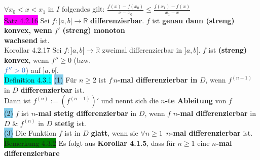 \documentclass[10pt]{article}
\begin{document}
        \indent \textcolor{NavyBlue}{$\forall x_0<x<x_1$} in \textcolor{NavyBlue}{$I$}
                folgendes gilt: \textcolor{NavyBlue}{
                $\frac{f(x)-f(x_0)}{x-x_0}\leqslant\frac{f(x_1)-f(x)}{x_1-x}$} \\
\colorbox{magenta}{Satz 4.2.16} Sei \textcolor{NavyBlue}{$f:]a,b[\longrightarrow\mathbb{R}$}
                \textbf{differenzierbar}. 
                \textcolor{NavyBlue}{$f$} ist \textbf{genau dann (streng) konvex, wenn} 
                \textcolor{NavyBlue}{$f'$} \textbf{(streng) monoton\\
        \indent wachsend} ist.\\
\colorbox{BurntOrange}{Korollar 4.2.17} Sei 
                \textcolor{NavyBlue}{$f:]a,b[\longrightarrow\mathbb{R}$}
                zweimal differenzierbar in \textcolor{NavyBlue}{$]a,b[$}. 
                \textcolor{NavyBlue}{$f$} ist \textbf{(streng) konvex}, 
                wenn \textcolor{NavyBlue}{$f''\geqslant0$} (bzw. \\
        \indent $\textcolor{NavyBlue}{f''>0}$) auf \textcolor{NavyBlue}{$]a,b[$}.\\
\colorbox{cyan}{Definition 4.3.1} \colorbox{SkyBlue}{(1)} Für $n\geqslant2$ ist 
                $f\,n$\textbf{-mal differenzierbar in} $D$, wenn 
                \textcolor{NavyBlue}{$f^{(n-1)}$} in \textcolor{NavyBlue}{$D$}
                \textbf{differenzierbar} ist. \\
        \indent\indent Dann ist \textcolor{NavyBlue}{$f^{(n)}:=(f^{(n-1)})'$} und nennt 
                sich die $n$\textbf{-te Ableitung} von \textcolor{NavyBlue}{$f$}\\
        \indent \colorbox{SkyBlue}{(2)} \textcolor{NavyBlue}{$f$} 
                ist $n$\textbf{-mal stetig differenzierbar} in \textcolor{NavyBlue}{$D$}, 
                wenn \textcolor{NavyBlue}{$f$} 
                \textbf{$n$-mal differenzierbar} in \textcolor{NavyBlue}{$D$}
                \& \textcolor{NavyBlue}{$f^{(n)}$} 
                in \textcolor{NavyBlue}{$D$} \textbf{stetig} ist.\\
        \indent \colorbox{SkyBlue}{(3)} Die Funktion \textcolor{NavyBlue}{$f$} 
                ist in \textcolor{NavyBlue}{$D$} \textbf{glatt}, wenn sie 
                \textcolor{NavyBlue}{$\forall n\geqslant1$}\,
                \textbf{$n$-mal differenzierbar} ist.\\
\colorbox{green}{Bemerkung 4.3.2} Es folgt aus \textbf{Korollar 4.1.5}, dass für 
                \textcolor{NavyBlue}{$n\geqslant1$} eine \textbf{$n$-mal differenzierbare}
\end{document}
